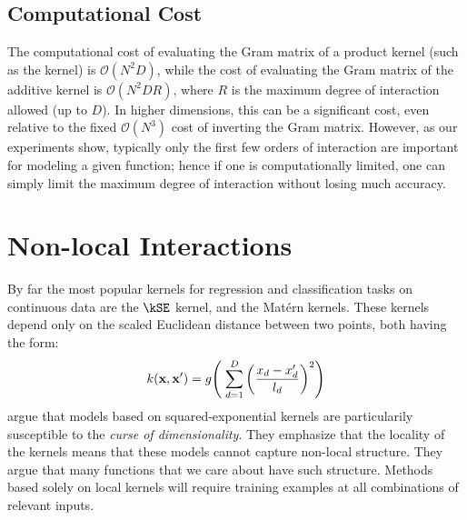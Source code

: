 

\subsection{Computational Cost}
The computational cost of evaluating the Gram matrix of a product kernel (such as the \kSE{} kernel) is $\mathcal{O}(N^2D)$, while the cost of evaluating the Gram matrix of the additive kernel is $\mathcal{O}(N^2DR)$, where $R$ is the maximum degree of interaction allowed (up to $D$).
In higher dimensions, this can be a significant cost, even relative to the fixed $\mathcal{O}(N^3)$ cost of inverting the Gram matrix.
However, as our experiments show, typically only the first few orders of interaction are important for modeling a given function; hence if one is computationally limited, one can simply limit the maximum degree of interaction without losing much accuracy.



\section{Non-local Interactions}
%
By far the most popular kernels for regression and classification tasks on continuous data are the $\kSE$ kernel, and the Mat\'{e}rn kernels.
These kernels depend only on the scaled Euclidean distance between two points, both having the form:
\begin{align}
k({\bf x, x'}) = g \!\left( \; \sum_{d=1}^D \left( \frac{  x_{d} - x_{d}' }{ l_d } \right)^2 \right)
\end{align}
\citet{bengio2006curse} argue that models based on squared-exponential kernels are particularily susceptible to the \textit{curse of dimensionality}.
They emphasize that the locality of the kernels means that these models cannot capture non-local structure. 
They argue that many functions that we care about have such structure.
Methods based solely on local kernels will require training examples at all combinations of relevant inputs.

